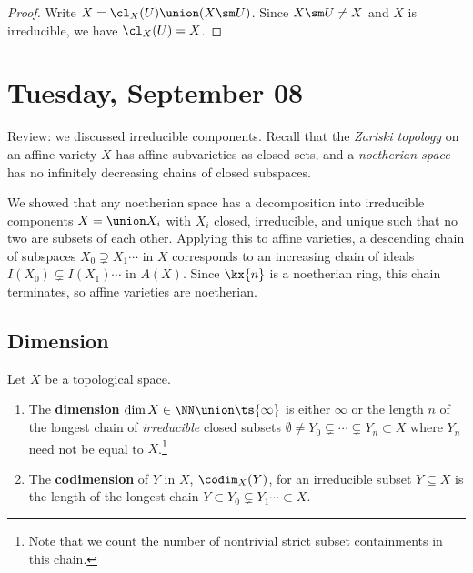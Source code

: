 \begin{proof}

Write \(X = \cl_X(U) \union (X\sm U)\). Since \(X\sm U \neq X\) and
\(X\) is irreducible, we have \(\cl_X(U) = X\).

\end{proof}

\hypertarget{tuesday-september-08}{%
\section{Tuesday, September 08}\label{tuesday-september-08}}

Review: we discussed irreducible components. Recall that the
\emph{Zariski topology} on an affine variety \(X\) has affine
subvarieties as closed sets, and a \emph{noetherian space} has no
infinitely decreasing chains of closed subspaces.

We showed that any noetherian space has a decomposition into irreducible
components \(X = \union X_i\) with \(X_i\) closed, irreducible, and
unique such that no two are subsets of each other. Applying this to
affine varieties, a descending chain of subspaces
\(X_0 \supsetneq X_1 \cdots\) in \(X\) corresponds to an increasing
chain of ideals \(I(X_0) \subsetneq I(X_1) \cdots\) in \(A(X)\). Since
\(\kx{n}\) is a noetherian ring, this chain terminates, so affine
varieties are noetherian.

\hypertarget{dimension}{%
\subsection{Dimension}\label{dimension}}

\begin{definition}[Dimensions]

Let \(X\) be a topological space.

\begin{enumerate}
\def\labelenumi{\arabic{enumi}.}
\item
  The \textbf{dimension} \(\dim X \in \NN\union\ts{\infty}\) is either
  \(\infty\) or the length \(n\) of the longest chain of
  \emph{irreducible} closed subsets
  \(\emptyset \neq Y_0 \subsetneq \cdots \subsetneq Y_n \subset X\)
  where \(Y_n\) need not be equal to \(X\).\footnote{Note that we count
    the number of nontrivial strict subset containments in this chain.}
\item
  The \textbf{codimension} of \(Y\) in \(X\), \(\codim_X(Y)\), for an
  irreducible subset \(Y\subseteq X\) is the length of the longest chain
  \(Y\subset Y_0 \subsetneq Y_1 \cdots \subset X\).
\end{enumerate}

\end{definition}

